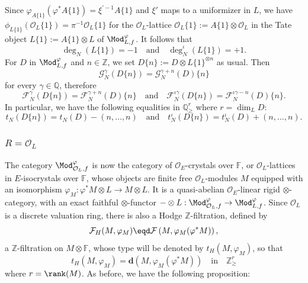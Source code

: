 Since $\varphi_{A\{1\}}(\varphi^{\ast}A\{1\})=\xi^{\prime-1}A\{1\}$ and $\xi'$ maps to a uniformizer in $L$, we have $\phi_{L\{1\}}(\mathcal{O}_{L}\{1\})=\pi^{-1}\mathcal{O}_{L}\{1\}$ for the $\mathcal{O}_{L}$-lattice $\mathcal{O}_{L}\{1\}:=A\{1\}\otimes\mathcal{O}_{L}$ in the Tate object $L\{1\}:=A\{1\}\otimes L$ of $\Mod_{L,f}^{\varphi}$. It follows that
\[
\deg_{N}(L\{1\})=-1\quad\text{and}\quad\deg_{N}^{\iota}(L\{1\})=+1.
\]
For $D$ in $\Mod_{L,f}^{\varphi}$ and $n\in\mathbb{Z}$, we set $D\{n\}:=D\otimes L\{1\}^{\otimes n}$ as usual. Then
\[
\mathcal{G}_{N}^{\gamma}(D\{n\})=\mathcal{G}_{N}^{\gamma+n}(D)\{n\}
\]
for every $\gamma\in\mathbb{Q}$, therefore
\[
\mathcal{F}_{N}^{\gamma}(D\{n\})=\mathcal{F}_{N}^{\gamma+n}(D)\{n\}\quad\text{and}\quad\mathcal{F}_{N}^{\iota\gamma}(D\{n\})=\mathcal{F}_{N}^{\iota\gamma-n}(D)\{n\}.
\]
In particular, we have the following equalities in $\mathbb{Q}_{\geq}^{r}$ where $r=\dim_{L}D$:
\[
t_{N}(D\{n\})=t_{N}(D)-(n,\dots,n)\quad\text{and}\quad t_{N}^{\iota}(D\{n\})=t_{N}^{\iota}(D)+(n,\dots,n).
\]

\subsubsection{\texorpdfstring{${R=\mathcal{O}_{L}}$}{R=OL}}\label{subsec:RisOL}

The category $\Mod_{\mathcal{O}_{L},f}^{\varphi}$ is now the category of $\mathcal{O}_{E}$-crystals over $\mathbb{F}$, or $\mathcal{O}_{L}$-lattices in $E$-isocrystals over $\mathbb{F}$, whose objects are finite free $\mathcal{O}_{L}$-modules $M$ equipped with an isomorphism $\varphi_{M}:\varphi^{\ast}M\otimes L\rightarrow M\otimes L$. It is a quasi-abelian $\mathcal{O}_{E}$-linear rigid $\otimes$-category, with an exact faithful $\otimes$-functor $-\otimes L:\Mod_{\mathcal{O}_{L},f}^{\varphi}\rightarrow\Mod_{L,f}^{\varphi}$. Since $\mathcal{O}_{L}$ is a discrete valuation ring, there is also a Hodge $\mathbb{Z}$-filtration, defined by
\[
\mathcal{F}_{H}(M,\varphi_{M})\eqd\mathcal{F}\left(M,\varphi_{M}(\varphi^{\ast}M)\right),
\]
a $\mathbb{Z}$-filtration on $M\otimes\mathbb{F}$, whose type will be denoted by $t_{H}(M,\varphi_{M})$, so that
\[
t_{H}(M,\varphi_{M})=\mathbf{d}\left(M,\varphi_{M}(\varphi^{\ast}M)\right)\quad\text{in}\quad\mathbb{Z}_{\geq}^{r}
\]
where $r=\rank(M)$. As before, we have the following proposition:

